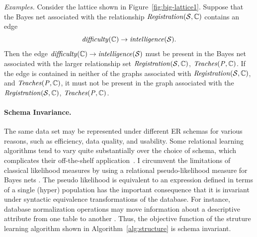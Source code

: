 \documentclass{sfuthesis}
\begin{document}
{\em Examples.} 
Consider the lattice shown in Figure~\ref{fig:big-lattice1}. 
Suppose that the Bayes net associated with the relationship $\mathit{Registration}(\mathcal{S},\mathbb{C})$ contains an edge $$\it{difficulty}(\mathbb{C}) \rightarrow \it{intelligence}(\mathcal{S}).$$ 
Then the edge $\it{difficulty}(\mathbb{C}) \rightarrow \it{intelligence}(\mathcal{S})$ must be present in the Bayes net associated with the larger relationship set $\mathit{Registration}(\mathcal{S},\mathbb{C})$, $\it{Teaches}(P,\mathbb{C})$. If the edge is contained  in neither of the graphs associated with $\mathit{Registration}(\mathcal{S},\mathbb{C})$, and $\it{Teaches}(P,\mathbb{C})$, it must not be present in the graph associated with the $\mathit{Registration}(\mathcal{S},\mathbb{C})$, $\it{Teaches}(P,\mathbb{C})$.

\paragraph{Schema Invariance.}
The same data set may be represented under different ER schemas for various reasons, such as efficiency, data quality, and usability.
Some relational learning algorithms tend to vary quite substantially over the choice of schema, which complicates their off-the-shelf application~\cite{Picado2016}.  I circumvent the limitations of classical likelihood measures by using a relational pseudo-likelihood measure for Bayes nets \cite{Schulte2011}. 
The pseudo likelihood is equivalent to an expression defined in terms of a single (hyper) population has the important consequence that it is invariant under syntactic equivalence transformations of the database. For instance, database normalization operations may move information about a descriptive attribute from one table to another \cite{Kent1983}.  Thus, the objective function of the struture learning algorithm shown in Algorithm~\ref{alg:structure} is schema invariant.
\end{document}
